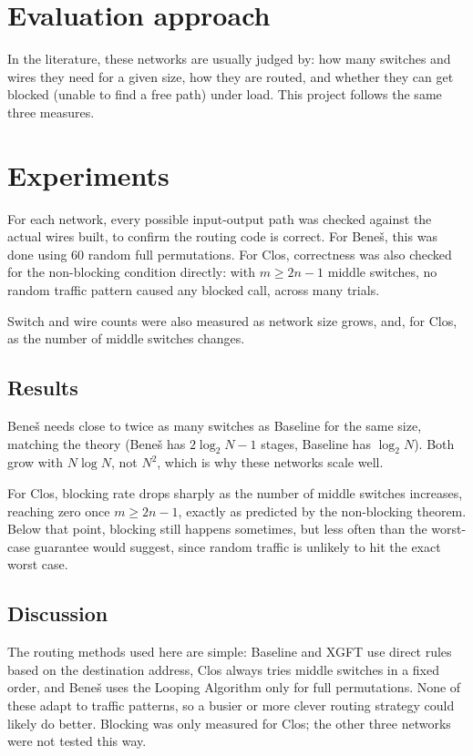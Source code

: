 \documentclass[11pt]{article}
\begin{document}
\section{Evaluation approach}
In the literature, these networks are usually judged by: how many
switches and wires they need for a given size, how they are
routed, and whether they can get blocked (unable to find a free
path) under load. This project follows the same three measures.

\section{Experiments}
For each network, every possible input-output path was checked
against the actual wires built, to confirm the routing code is
correct. For Beneš, this was done using 60 random full
permutations. For Clos, correctness was also checked for the
non-blocking condition directly: with $m \geq 2n-1$ middle
switches, no random traffic pattern caused any blocked call, across
many trials.

Switch and wire counts were also measured as network size grows,
and, for Clos, as the number of middle switches changes.

\subsection{Results}
Beneš needs close to twice as many switches as Baseline for the
same size, matching the theory (Beneš has $2\log_2 N - 1$ stages,
Baseline has $\log_2 N$). Both grow with $N \log N$, not $N^2$,
which is why these networks scale well.

For Clos, blocking rate drops sharply as the number of middle
switches increases, reaching zero once $m \geq 2n - 1$, exactly as
predicted by the non-blocking theorem. Below that point, blocking
still happens sometimes, but less often than the worst-case
guarantee would suggest, since random traffic is unlikely to hit
the exact worst case.

\subsection{Discussion}
The routing methods used here are simple: Baseline and XGFT use
direct rules based on the destination address, Clos always tries
middle switches in a fixed order, and Beneš uses the Looping
Algorithm only for full permutations. None of these adapt to
traffic patterns, so a busier or more clever routing strategy could
likely do better. Blocking was only measured for Clos; the other
three networks were not tested this way.
\end{document}
